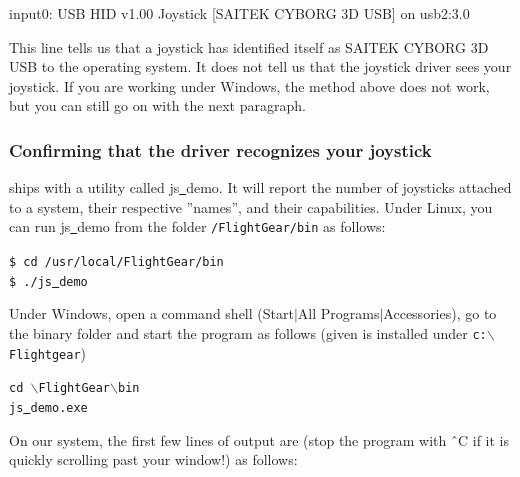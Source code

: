 \begin{ttfamily}
\noindent
   input0: USB HID v1.00 Joystick [SAITEK CYBORG 3D USB] on usb2:3.0
\end{ttfamily}
\medskip

\noindent
This line tells us that a joystick has identified itself as SAITEK CYBORG 3D USB to the operating system.  It does not tell us that the joystick driver sees your joystick. If you are working under Windows, the method above does not work, but you can still go on with the next paragraph.

\subsubsection{Confirming that the driver recognizes your joystick\label{confirming}}
\FlightGear{} ships with a utility called js\underline{~}demo. It will report the number of joysticks attached to a system, their respective ''names'', and their capabilities. Under Linux, you can run js\underline{~}demo from the folder \texttt{/FlightGear/bin} as follows:
\medskip

\noindent
	\texttt{\$ cd /usr/local/FlightGear/bin}\\	
	\texttt{\$ ./js\underline{~}demo}
\medskip

\noindent
Under Windows, open a command shell (Start$\left|\right.$All Programs$\left|\right.$Accessories), go to the \FlightGear{} binary folder and start the program as follows (given \FlightGear{} is installed under \texttt{c:$\backslash$Flightgear})
\medskip

\noindent
	\texttt{cd {$\backslash$}FlightGear{$\backslash$}bin}\\	
	\texttt{js\underline{~}demo.exe}
\medskip

On our system, the first few lines of output are (stop the program with \^{~}C if it is quickly scrolling  past your window!) as follows:
\medskip

